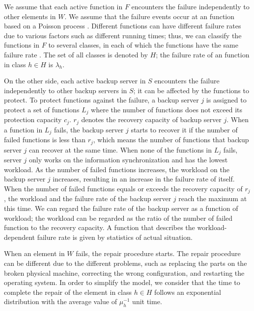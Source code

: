 \documentclass[conference]{IEEEtran}
\begin{document}
We assume that each active function in $F$ encounters the failure independently to other elements in $W$. We assume that the failure events occur at an function based on a Poisson process \cite{paxson1995wide}. Different functions can have different failure rates due to various factors such as different running times; thus, we can classify the functions in $F$ to several classes, in each of which the functions have the same failure rate \cite{kuwabara1993calculation}. The set of all classes is denoted by $H$; the failure rate of an function in class $h \in H$ is $\lambda_h$.

On the other side, each active backup server in $S$ encounters the failure independently to other backup servers in $S$; it can be affected by the functions to protect. To protect functions against the failure, a backup server $j$ is assigned to protect a set of functions $L_j$ where the number of functions does not exceed its protection capacity $c_j$. $r_j$ denotes the recovery capacity of backup server $j$. When a function in $L_j$ fails, the backup server $j$ starts to recover it if the number of failed functions is less than $r_j$, which means the number of functions that backup server $j$ can recover at the same time. When none of the functions in $L_j$ fails, server $j$ only works on the information synchronization and has the lowest workload. As the number of failed functions increases, the workload on the backup server $j$ increases, resulting in an increase in the failure rate of itself. When the number of failed functions equals or exceeds the recovery capacity of $r_j$, the workload and the failure rate of the backup server $j$ reach the maximum at this time. We can regard the failure rate of the backup server as a function of workload; the workload can be regarded as the ratio of the number of failed function to the recovery capacity. A function that describes the workload-dependent failure rate is given by statistics of actual situation. 

When an element in $W$ fails, the repair procedure starts. The repair procedure can be different due to the different problems, such as replacing the parts on the broken physical machine, correcting the wrong configuration, and restarting the operating system. In order to simplify the model, we consider that the time to complete the repair of the element in class $h \in H$ follows an exponential distribution with the average value of $\mu_h^{-1}$ unit time.
\end{document}
